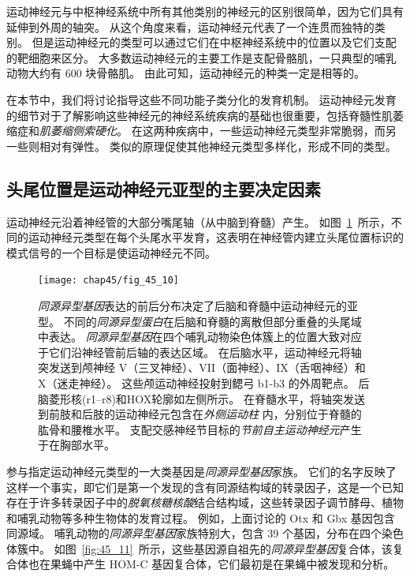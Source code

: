 运动神经元与中枢神经系统中所有其他类别的神经元的区别很简单，因为它们具有延伸到外周的轴突。
从这个角度来看，运动神经元代表了一个连贯而独特的类别。
但是运动神经元的类型可以通过它们在中枢神经系统中的位置以及它们支配的靶细胞来区分。
大多数运动神经元的主要工作是支配骨骼肌，一只典型的哺乳动物大约有 600 块骨骼肌。
由此可知，运动神经元的种类一定是相等的。


在本节中，我们将讨论指导这些不同功能子类分化的发育机制。
运动神经元发育的细节对于了解影响这些神经元的神经系统疾病的基础也很重要，包括脊髓性肌萎缩症和\textit{肌萎缩侧索硬化}。
在这两种疾病中，一些运动神经元类型非常脆弱，而另一些则相对有弹性。
类似的原理促使其他神经元类型多样化，形成不同的类型。



\subsection{头尾位置是运动神经元亚型的主要决定因素}

运动神经元沿着神经管的大部分嘴尾轴（从中脑到脊髓）产生。
如图~\ref{fig:45_10}~所示，不同的运动神经元类型在每个头尾水平发育，这表明在神经管内建立头尾位置标识的模式信号的一个目标是使运动神经元不同。


\begin{figure}[htbp]
	\centering
	\texttt{[image: chap45/fig\_45\_10]}
	\caption{\textit{同源异型基因}表达的前后分布决定了后脑和脊髓中运动神经元的亚型。
		不同的\textit{同源异型蛋白}在后脑和脊髓的离散但部分重叠的头尾域中表达。
		\textit{同源异型基因}在四个哺乳动物染色体簇上的位置大致对应于它们沿神经管前后轴的表达区域。
		在后脑水平，运动神经元将轴突发送到颅神经 V（三叉神经）、VII（面神经）、IX（舌咽神经）和 X（迷走神经）。
		这些颅运动神经投射到鳃弓 b1-b3 的外周靶点。
		后脑菱形核(r1–r8)和HOX轮廓如左侧所示。
		在脊髓水平，将轴突发送到前肢和后肢的运动神经元包含在\textit{外侧运动柱} 内，分别位于脊髓的肱骨和腰椎水平。
		支配交感神经节目标的\textit{节前自主运动神经元}产生于在胸部水平\cite{kiecker2005compartments}。 }
	\label{fig:45_10}
\end{figure}


参与指定运动神经元类型的一大类基因是\textit{同源异型基因}家族。
它们的名字反映了这样一个事实，即它们是第一个发现的含有同源结构域的转录因子，这是一个已知存在于许多转录因子中的\textit{脱氧核糖核酸}结合结构域，这些转录因子调节酵母、植物和哺乳动物等多种生物体的发育过程。
例如，上面讨论的 Otx 和 Gbx 基因包含同源域。
哺乳动物的\textit{同源异型基因}家族特别大，包含 39 个基因，分布在四个染色体簇中。
如图~\ref{fig:45_11}~所示，这些基因源自祖先的\textit{同源异型基因}复合体，该复合体也在果蝇中产生 HOM-C 基因复合体，它们最初是在果蝇中被发现和分析。


